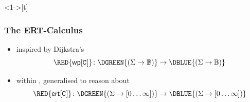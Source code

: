 \documentclass[
11pt,
usepdftitle=false,
aspectratio=169,
xcolor={table,usenames,dvipsnames},
]{beamer}
\begin{document}
\begin{frame}<1->[t]
  \frametitle{The ERT-Calculus}
  \begin{itemize}
  \item inspired by Dijkstra's 
    {
      \[
        \RED{\mathsf{wp}[{\cmd}]} \ofdom \DGREEN{(\Store \to\tikzanchor[xshift=-4mm, yshift=-1mm]{f} \B)} \to \DBLUE{(\Store \to\tikzanchor[xshift=-4mm, yshift=4mm]{g} \B)}
      \]
    }\bskip


  \item<3-> within , generalised to reason about \vspace{1.1cm}
    {
      \[
        \RED{\ert{\cmd}} \ofdom \DGREEN{(\Store \to\tikzanchor[xshift=-2mm, yshift=0mm]{f} [0\dots\infty])} \to \DBLUE{(\Store \to\tikzanchor[xshift=2mm, yshift=4mm]{g} [0\dots\infty])}
      \]
    }\bigskip\bigskip
  \end{itemize}

\end{frame}
\end{document}
